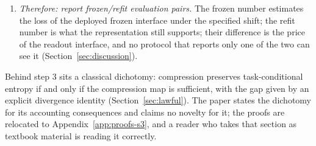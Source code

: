 \documentclass[twocolumn,10pt]{article}
\theoremstyle{definition}
\theoremstyle{remark}
\newcommand{\CE}{\mathrm{CE}}
\newcommand{\CEQ}[1]{\CE_{Q}({#1})}
\newcommand{\rP}{r_{P}}
\begin{document}
\begin{enumerate}
evaluated \emph{frozen} under a shifted $Q$ measures a deployment
property, $\CEQ{\rP}$, that no entropy bounds and no in-distribution
measurement constrains. In a constructed Gaussian channel, an
insufficiency of analytic size $0.0004$ bits (invisible to any
realistic test) cost $\approx 1.7$ bits of frozen-readout transfer
cross-entropy when the nuisance--signal coupling flipped sign
(Section~\ref{sec:exp1}). CIFAR-10 CNNs trained with a constructed
class-indexed color cue beat a cue-decorrelated control
in-distribution \emph{at every coupling strength}, then lost up to
$3.56$ bits under a decorrelating shift while the control moved at
most $0.021$ bits (Section~\ref{sec:exp3}). This \emph{masking} is
hidden both by in-distribution testing and by any evaluation that
silently refits the readout under the shifted distribution.
\item \emph{Therefore: report frozen/refit evaluation pairs.} The
frozen number estimates the loss of the deployed frozen interface under
the specified shift; the refit number is
what the representation still supports; their difference is the price
of the readout interface, and no protocol that reports only one of
the two can see it (Section~\ref{sec:discussion}).
\end{enumerate}

Behind step 3 sits a classical dichotomy: compression preserves
task-conditional entropy if and only if the compression map is
sufficient, with the gap given by an explicit divergence identity
(Section~\ref{sec:lawful}). The paper states the dichotomy for its
accounting consequences and claims no novelty for it; the proofs are
relocated to Appendix~\ref{app:proofs-s3}, and a reader who takes
that section as textbook material is reading it correctly.
\end{document}
